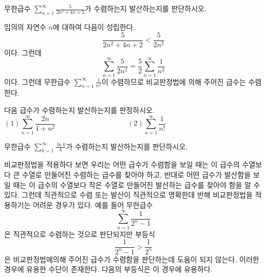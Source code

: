 \documentclass[11pt, a4paper]{book}
\begin{document}
\vspace{1em}
\begin{example}
	무한급수 $\displaystyle \sum_{n=1}^{\infty}\frac{5}{2n^{2}+4n+2}$가 수렴하는지 발산하는지를 판단하시오.
	\begin{solution}
		임의의 자연수 $n$에 대하여 다음이 성립한다.
		\begin{equation*}
			\frac{5}{2n^{2}+4n+2} < \frac{5}{2n^2}
		\end{equation*}
		이다. 그런데 
		\begin{equation*}
			\sum_{n=1}^{\infty} \frac{5}{2n^{2}} =\frac{5}{2} \sum_{n=1}^{\infty} \frac{1}{n^{2}}
		\end{equation*}
		이다. 그런데 무한급수 $\sum_{n=1}^{\infty}\frac{1}{n^{2}}$이 수렴하므로 비교판정법에 의해 주어진 급수는 수렴한다.
	\end{solution}
\end{example}
\vspace{1em}
\begin{problem}
	다음 급수가 수렴하는지 발산하는지를 판정하시오.
	\begin{equation*}
	 (1) \sum_{n=1}^{\infty} \frac{2n}{1+n^{2}} \qquad \qquad \qquad \qquad \qquad (2) \sum_{n=1}^{\infty} \frac{1}{n !} \qquad \qquad \qquad \qquad \qquad \qquad \qquad 
	\end{equation*}
\end{problem}
\vspace{1em}
\begin{problem}
	무한급수 $\displaystyle \sum_{k=1}^{\infty}\frac{\ln k}{k}$가 수렴하는지 발산하는지를 판단하시오.
\end{problem}
\vspace{1em}

  비교판정법을 적용하다 보면 우리는 어떤 급수가 수렴함을 보일 때는 이 급수의 수열보다 큰 수열로 만들어진 수렴하는 급수를 찾아야 하고, 반대로 어떤 급수가 발산함을 보일 때는 이 급수의 수열보다 작은 수열로 만들어진 발산하는 급수를 찾아야 함을 알 수 있다. 그런데 직관적으로 수렴 또는 발산이 직관적으로 명확한데 반해 비교판정법을 적용하기는 어려운 경우가 있다. 예를 들어 무한급수
  \begin{equation*}
  	\sum_{n=1}^{\infty} \frac{1}{2^{n}-1}
  \end{equation*}
은 직관적으로 수렴하는 것으로 판단되지만 부등식
\begin{equation*}
	\frac{1}{2^{n}-1} > \frac{1}{2^{n}}
\end{equation*}
은 비교판정법에의해 주어진 급수가 수렴함을 판단하는데 도움이 되지 않는다. 이러한 경우에 유용한 수단이 존재한다. 다음의 부등식은 이 경우에 유용하다. 
\end{document}
